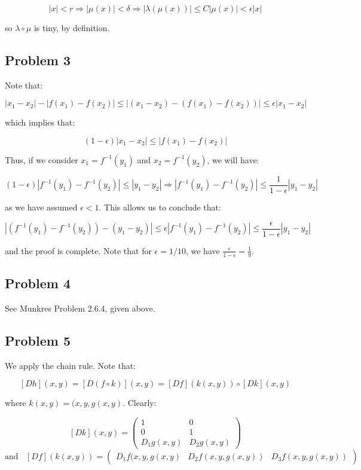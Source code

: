 \documentclass[10pt, oneside]{amsart}
\begin{document}
      $$|x| < r \Rightarrow |\mu(x)| < \delta \Rightarrow |\lambda(\mu(x))| \leq C |\mu(x)| < \epsilon |x|$$

      so $\lambda \circ \mu$ is tiny, by definition.

      \subsection{Problem 3}

      Note that:

      $$|x_1 - x_2| - |f(x_1) - f(x_2)| \leq |(x_1 - x_2) - (f(x_1) - f(x_2))| \leq \epsilon |x_1 - x_2|$$

      which implies that:

      $$(1 - \epsilon)|x_1 - x_2| \leq |f(x_1) - f(x_2)|$$

      Thus, if we consider $x_1 = f^{-1}(y_1)$ and $x_2 = f^{-1}(y_2)$, we will have:

      $$(1 - \epsilon)|f^{-1}(y_1) - f^{-1}(y_2)| \leq |y_1 - y_2| \Rightarrow |f^{-1}(y_1) - f^{-1}(y_2)| \leq \frac{1}{1 - \epsilon} |y_1 - y_2|$$

      as we have assumed $\epsilon < 1$. This allows us to conclude that:

      $$|(f^{-1}(y_1) - f^{-1}(y_2)) - (y_1 - y_2)| \leq \epsilon |f^{-1}(y_1) - f^{-1}(y_2)| \leq \frac{\epsilon}{1 - \epsilon} |y_1 - y_2|$$

      and the proof is complete. Note that for $\epsilon = 1/10$, we have $\frac{\epsilon}{1 - \epsilon} = \frac{1}{9}$.

      \subsection{Problem 4}

      See Munkres Problem 2.6.4, given above.

      \subsection{Problem 5}

      We apply the chain rule. Note that:

      $$[Dh](x, y) = [D(f \circ k)](x, y) = [Df](k(x, y)) \circ [Dk](x, y)$$

      where $k(x, y) = (x, y, g(x, y)$. Clearly:

      $$[Dk](x, y) = \begin{pmatrix} 1 & 0 \\ 0 & 1 \\ D_1 g(x, y) & D_2 g(x, y) \end{pmatrix}$$
      $$\text{and} \ \ \ \ [Df](k(x, y)) = \begin{pmatrix} D_1 f(x, y, g(x, y) & D_2 f(x, y, g(x, y)) & D_3 f(x, y, g(x, y)) \end{pmatrix}$$
\end{document}
